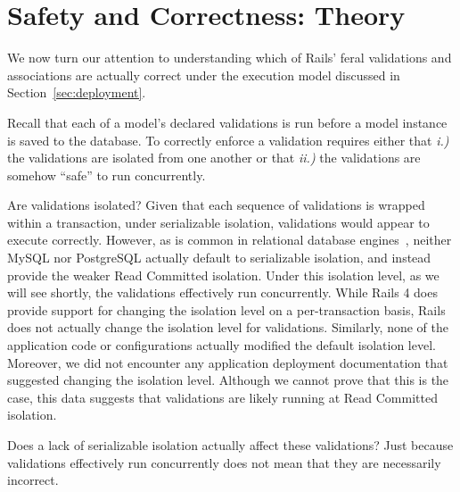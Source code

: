 
\section{Safety and Correctness: Theory}
\label{sec:apps}

We now turn our attention to understanding which of Rails' feral
validations and associations are actually correct under the execution
model discussed in Section~\ref{sec:deployment}. 

Recall that each of a model's declared validations is run before a model instance is saved to
the database. To correctly enforce a validation requires either that
\textit{i.)} the validations are isolated from one another or
that \textit{ii.)} the validations are somehow ``safe'' to run
concurrently.

Are validations isolated? Given that each sequence of
validations is wrapped within a transaction, under serializable
isolation, validations would appear to execute correctly. However, as
is common in relational database engines~\cite{hat-vldb}, neither
MySQL nor PostgreSQL actually default to serializable isolation, and
instead provide the weaker Read Committed isolation. Under this
isolation level, as we will see shortly, the validations effectively
run concurrently. While Rails 4 does provide support for changing the
isolation level on a per-transaction basis, Rails does not actually
change the isolation level for validations. Similarly, none of the
application code or configurations actually modified the default
isolation level. Moreover, we did not encounter any application
deployment documentation that suggested changing the isolation
level. Although we cannot prove that this is the case, this data
suggests that validations are likely running at Read Committed
isolation.

Does a lack of serializable isolation actually affect these validations? Just
because validations effectively run concurrently does not mean that they are
necessarily incorrect.








